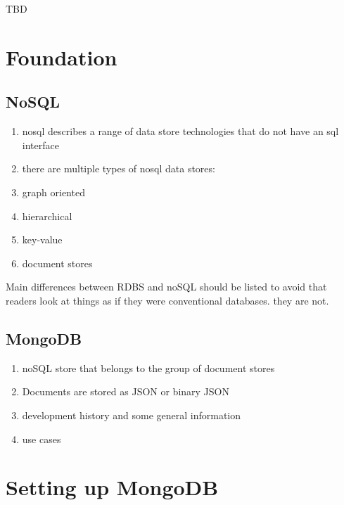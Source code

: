 TBD


\newpage

\section{Foundation}
\label{sec:foundation}

\subsection{NoSQL}
\label{sec:nosql}

\begin{enumerate}
  \item nosql describes a range of data store technologies that do not have an sql interface
  \item there are multiple types of nosql data stores:
  \item graph oriented
  \item hierarchical
  \item key-value
  \item document stores
\end{enumerate}
    

Main differences between RDBS and noSQL should be listed to avoid that readers
look at things as if they were conventional databases. they are not.

\subsection{MongoDB}
\label{sec:mongodb}

\begin{enumerate}
  \item  noSQL store that belongs to the group of document stores
  \item Documents are stored as JSON or binary JSON
  \item development history and some general information
  \item use cases
\end{enumerate}    

    
    

\section{Setting up MongoDB}
\label{sec:setup}

